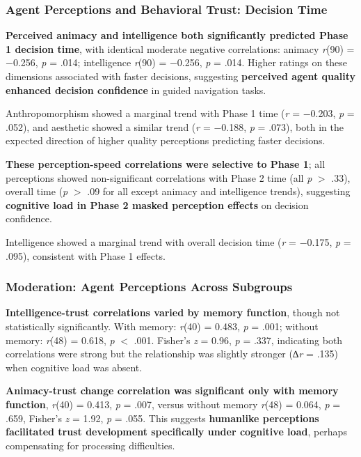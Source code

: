 \documentclass[12pt]{article}
\begin{document}
\subsubsection{Agent Perceptions and Behavioral Trust: Decision Time}

\textbf{Perceived animacy and intelligence both significantly predicted Phase 1 decision time}, with identical moderate negative correlations: animacy \textit{r}(90) = $-$0.256, \textit{p} = .014; intelligence \textit{r}(90) = $-$0.256, \textit{p} = .014. Higher ratings on these dimensions associated with faster decisions, suggesting \textbf{perceived agent quality enhanced decision confidence} in guided navigation tasks.

Anthropomorphism showed a marginal trend with Phase 1 time (\textit{r} = $-$0.203, \textit{p} = .052), and aesthetic showed a similar trend (\textit{r} = $-$0.188, \textit{p} = .073), both in the expected direction of higher quality perceptions predicting faster decisions.

\textbf{These perception-speed correlations were selective to Phase 1}; all perceptions showed non-significant correlations with Phase 2 time (all \textit{p} $>$ .33), overall time (\textit{p} $>$ .09 for all except animacy and intelligence trends), suggesting \textbf{cognitive load in Phase 2 masked perception effects} on decision confidence.

Intelligence showed a marginal trend with overall decision time (\textit{r} = $-$0.175, \textit{p} = .095), consistent with Phase 1 effects.

\subsubsection{Moderation: Agent Perceptions Across Subgroups}

\textbf{Intelligence-trust correlations varied by memory function}, though not statistically significantly. With memory: \textit{r}(40) = 0.483, \textit{p} = .001; without memory: \textit{r}(48) = 0.618, \textit{p} $<$ .001. Fisher's \textit{z} = 0.96, \textit{p} = .337, indicating both correlations were strong but the relationship was slightly stronger (∆\textit{r} = .135) when cognitive load was absent.

\textbf{Animacy-trust change correlation was significant only with memory function}, \textit{r}(40) = 0.413, \textit{p} = .007, versus without memory \textit{r}(48) = 0.064, \textit{p} = .659, Fisher's \textit{z} = 1.92, \textit{p} = .055. This suggests \textbf{humanlike perceptions facilitated trust development specifically under cognitive load}, perhaps compensating for processing difficulties.
\end{document}

